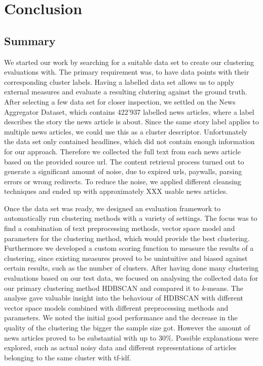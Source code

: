 \section{Conclusion}

\subsection{Summary}

We started our work by searching for a suitable data set to create our clustering evaluations with. The primary requirement was, to have data points with their corresponding cluster labels. Having a labelled data set allows us to apply external measures and evaluate a resulting clutering against the ground truth. After selecting a few data set for closer inspection, we settled on the News Aggregator Dataset, which contains 422'937 labelled news articles, where a label describes the story the news article is about. Since the same story label applies to multiple news articles, we could use this as a cluster descriptor. Unfortunately the data set only contained headlines, which did not contain enough information for our approach. Therefore we collected the full text from each news article based on the provided source url. The content retrieval process turned out to generate a significant amount of noise, due to expired urls, paywalls, parsing errors or wrong redirects. To reduce the noise, we applied different cleansing techniques and ended up with approximately XXX usable news articles.

Once the data set was ready, we designed an evaluation framework to automatically run clustering methods with a variety of settings. The focus was to find a combination of text preprocessing methods, vector space model and parameters for the clustering method, which would provide the best clustering. Furthermore we developed a custom scoring function to measure the results of a clustering, since existing measures proved to be unintuitive and biased against certain results, such as the number of clusters. After having done many clustering evaluations based on our test data, we focused on analysing the collected data for our primary clustering method HDBSCAN and compared it to \textit{k}-means. The analyse gave valuable insight into the behaviour of HDBSCAN with different vector space models combined with different preprocessing methods and parameters. We noted the initial good performance and the decrease in the quality of the clustering the bigger the sample size got. However the amount of news articles proved to be substantial with up to 30\%. Possible explanations were explored, such as actual noisy data and different representations of articles belonging to the same cluster with tf-idf.

